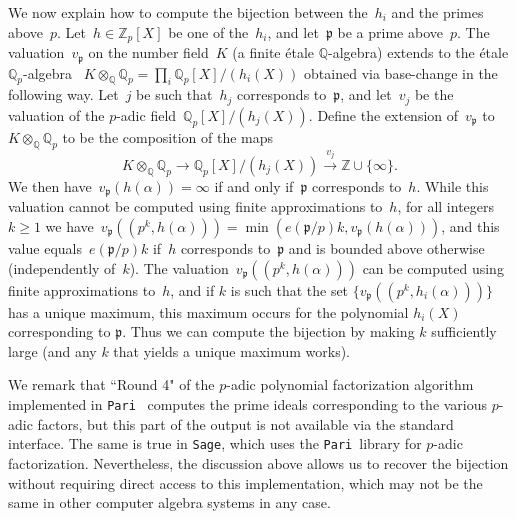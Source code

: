 \documentclass{article}
\def\Sage{{\tt Sage}}
\def\Pari{{\tt Pari}}
\def\Z{{\mathbb Z}}
\def\Q{{\mathbb Q}}
\def\p{{\mathfrak p}}
\begin{document}
We now explain how to compute the bijection between the~$h_i$ and the primes
above~$p$. Let~$h\in\Z_p[X]$ be one of the~$h_i$, and let~$\p$ be a prime
above~$p$. The valuation~$v_{\p}$ on the number field~$K$ (a finite \'etale $\Q$-algebra) extends to the \'etale $\Q_p$-algebra ~$K\otimes_{\Q}\Q_p = \prod_i
\Q_p[X]/(h_i(X))$ obtained via base-change in the following way.
Let~$j$ be such that~$h_{j}$ corresponds
to~$\p$, and let~$v_j$ be the valuation of the $p$-adic field~$\Q_p[X]/(h_j(X))$.
Define the extension of~$v_\p$ to $K\otimes_\Q\Q_p$ to be the composition of the maps
\[
  K\otimes_{\Q}\Q_p \longrightarrow \Q_p[X]/(h_j(X)) \stackrel{v_j}{\longrightarrow} \Z\cup\{\infty\}.
\]
We then have~$v_{\p}(h(\alpha)) = \infty$ if and only
if~$\p$ corresponds to~$h$.
While this valuation cannot be computed using finite
approximations to~$h$, for all integers~$k\ge 1$ we have~$v_\p((p^k,h(\alpha)))
= \min(e(\p/p)k, v_\p(h(\alpha)))$, and this value equals~$e(\p/p)k$
if~$h$ corresponds to~$\p$ and is bounded above otherwise (independently of~$k$). The
valuation~$v_\p((p^k,h(\alpha)))$ can be computed using finite approximations
to~$h$, and if $k$ is such that the set $\{v_\p((p^k,h_i(\alpha)))\}$ has a unique maximum, this maximum occurs for the polynomial $h_i(X)$ corresponding to $\p$.
Thus we can compute the bijection by making $k$ sufficiently large (and any $k$ that yields a unique maximum works).

We remark that ``Round 4" of the $p$-adic polynomial factorization
algorithm implemented in \Pari\ \cite{Roblot} computes the prime
ideals corresponding to the various $p$-adic factors, but this part of
the output is not available via the standard interface.  The same is
true in \Sage, which uses the \Pari\ library for $p$-adic
factorization.  Nevertheless, the discussion above allows us to
recover the bijection without requiring direct access to this
implementation, which may not be the same in other computer algebra
systems in any case.
\end{document}
